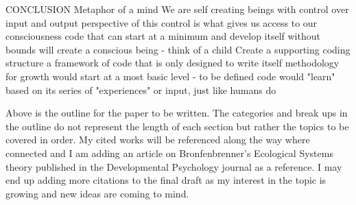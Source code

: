 \documentclass[11pt]{article}
\theoremstyle{plain}
\begin{document}
\begin{outline}[enumerate]
\1 CONCLUSION
\2 Metaphor of a mind
\3 We are self creating beings with control over input and output
\3 perspective of this control is what gives us access to our consciousness
\3 code that can start at a minimum and develop itself without bounds will create a conscious being - think of a child
\2 Create a supporting coding structure
\3 a framework of code that is only designed to write itself
\3 methodology for growth would start at a most basic level - to be defined
\3 code would "learn" based on its series of "experiences" or input, just like humans do
\end{outline}

\vspace{20mm}

Above is the outline for the paper to be written. The categories and break ups in the outline do not represent the length of each section but rather the topics to be covered in order. My cited works will be referenced along the way where connected and I am adding an article on Bronfenbrenner's Ecological Systems theory published in the Developmental Psychology journal as a reference. I may end up adding more citations to the final draft as my interest in the topic is growing and new ideas are coming to mind. 
\end{document}
